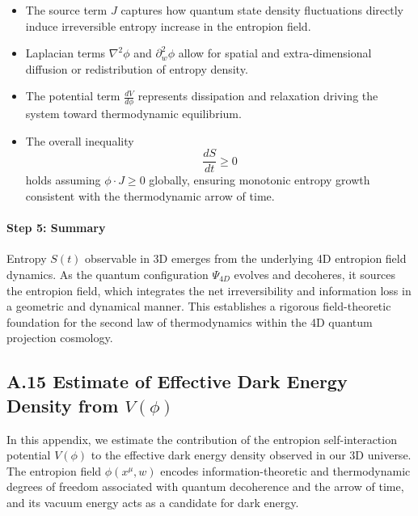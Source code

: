 \documentclass[12pt]{article}
\begin{document}
\begin{itemize}
    \item The source term \(J\) captures how quantum state density fluctuations directly induce irreversible entropy increase in the entropion field.
    \item Laplacian terms \(\nabla^2 \phi\) and \(\partial_w^2 \phi\) allow for spatial and extra-dimensional diffusion or redistribution of entropy density.
    \item The potential term \(\frac{dV}{d\phi}\) represents dissipation and relaxation driving the system toward thermodynamic equilibrium.
    \item The overall inequality
    \begin{equation}
    \frac{dS}{dt} \geq 0
    \label{eq:A14_SecondLaw}
    \end{equation}
    holds assuming \(\phi \cdot J \geq 0\) globally, ensuring monotonic entropy growth consistent with the thermodynamic arrow of time.
\end{itemize}

\paragraph{Step 5: Summary}

Entropy \(S(t)\) observable in 3D emerges from the underlying 4D entropion field dynamics. As the quantum configuration \(\Psi_{4D}\) evolves and decoheres, it sources the entropion field, which integrates the net irreversibility and information loss in a geometric and dynamical manner. This establishes a rigorous field-theoretic foundation for the second law of thermodynamics within the 4D quantum projection cosmology.

\subsection*{A.15 \quad Estimate of Effective Dark Energy Density from \( V(\phi) \)}
\label{app:A15_dark_energy_estimate}

In this appendix, we estimate the contribution of the entropion self-interaction potential \( V(\phi) \) to the effective dark energy density observed in our 3D universe. The entropion field \(\phi(x^\mu, w)\) encodes information-theoretic and thermodynamic degrees of freedom associated with quantum decoherence and the arrow of time, and its vacuum energy acts as a candidate for dark energy.

\vspace{1em}
\noindent
\end{document}
